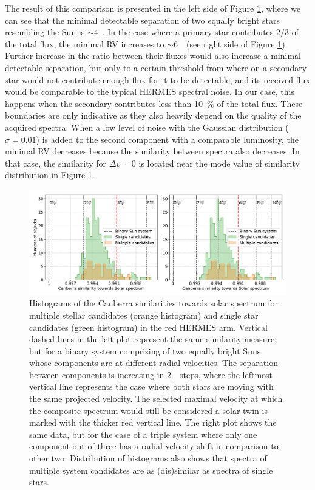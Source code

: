 The result of this comparison is presented in the left side of Figure \ref{fig:rv_similarity}, where we can see that the minimal detectable separation of two equally bright stars resembling the Sun is $\sim$4~\kms. In the case where a primary star contributes $2/3$ of the total flux, the minimal RV increases to $\sim$6~\kms\ (see right side of Figure \ref{fig:rv_similarity}). Further increase in the ratio between their fluxes would also increase a minimal detectable separation, but only to a certain threshold from where on a secondary star would not contribute enough flux for it to be detectable, and its received flux would be comparable to the typical HERMES spectral noise. In our case, this happens when the secondary contributes less than 10~\% of the total flux. These boundaries are only indicative as they also heavily depend on the quality of the acquired spectra. When a low level of noise with the Gaussian distribution ($\sigma = 0.01$) is added to the second component with a comparable luminosity, the minimal RV decreases because the similarity between spectra also decreases. In that case, the similarity for $\Delta v = 0$ is located near the mode value of similarity distribution in Figure \ref{fig:rv_similarity}. 

\begin{figure}
	\centering
	\includegraphics[width=\textwidth]{sinlg_multi_sim_b3_50_50_comb.png}
	\caption{Histograms of the Canberra similarities towards solar spectrum for multiple stellar candidates (orange histogram) and single star candidates (green histogram) in the red HERMES arm. Vertical dashed lines in the left plot represent the same similarity measure, but for a binary system comprising of two equally bright Suns, whose components are at different radial velocities. The separation between components is increasing in 2~\kms\ steps, where the leftmost vertical line represents the case where both stars are moving with the same projected velocity. The selected maximal velocity at which the composite spectrum would still be considered a solar twin is marked with the thicker red vertical line. The right plot shows the same data, but for the case of a triple system where only one component out of three has a radial velocity shift in comparison to other two. Distribution of histograms also shows that spectra of multiple system candidates are as (dis)similar as spectra of single stars.}
	\label{fig:rv_similarity}
\end{figure}

